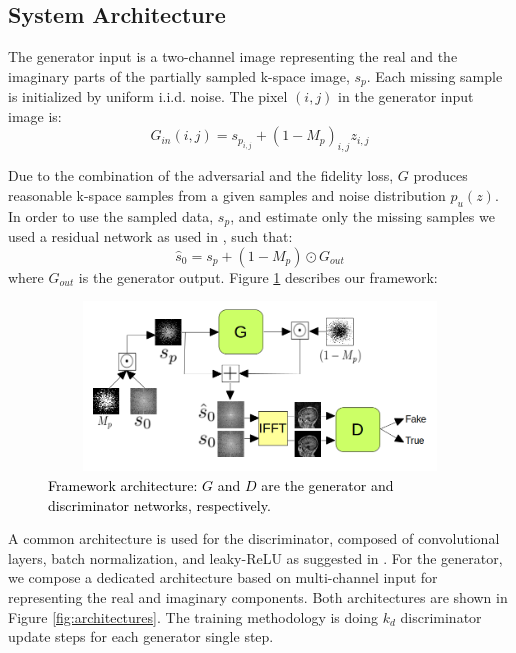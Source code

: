 \documentclass[review]{elsarticle}
\begin{document}
\subsection{System Architecture}

The generator input is a two-channel image representing the real and the imaginary parts of the partially sampled k-space image, $s_{p}$. Each missing sample is initialized by uniform i.i.d. noise. The pixel $\left(i,j\right)$ in the generator input image is: 
\begin{equation}
G_{in}\left(i,j\right)=s_{p_{i,j}}+\left(1-M_{p}\right)_{i,j}z_{i,j}
\end{equation}

Due to the combination of the adversarial and the fidelity loss, $G$ produces reasonable k-space samples from a given samples and noise distribution $p_{u}\left(z\right)$. In order to use the sampled data, $s_{p}$, and estimate only the missing samples we used a residual network \cite{he2016deep} as used in \cite{Oktay2016}, such that:
\begin{equation}
\hat{s}_{0}=s_{p}+\left(1-M_{p}\right)\odot G_{out}
\end{equation}
where $G_{out}$ is the generator output. Figure \ref{fig:system} describes our framework:

\begin{figure}[H]
	\centering{}\includegraphics[width=12.0cm,height=4.5cm]{include/grp2/system_chart}\caption{\label{fig:system} \textcolor{black}{\footnotesize{}{}Framework
			architecture: $G$ and $D$ are the generator and discriminator networks,
			respectively.}}
\end{figure}

A common architecture is used for the discriminator, composed of convolutional layers, batch normalization, and leaky-ReLU as suggested in \cite{radford2015unsupervised}. For the generator, we compose a dedicated architecture based on multi-channel input for representing the real and imaginary components. Both architectures are shown in Figure \ref{fig:architectures}.\textbf{ }The training methodology is doing $k_{d}$ discriminator update steps for each generator single step.
\end{document}
